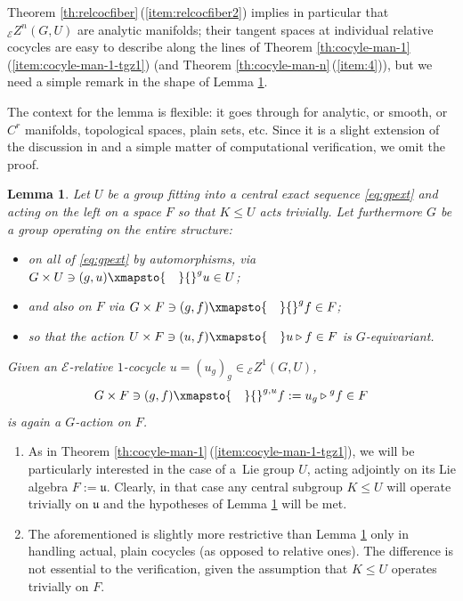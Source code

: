 \documentclass[pdftex]{sigma}
\numberwithin{equation}{section}
\newtheorem{Lemma}[Theorem]{Lemma}
\newcommand\cE{{\mathcal E}}
\newcommand\fu{{\mathfrak u}}
\begin{document}
Theorem \ref{th:relcocfiber}\,(\ref{item:relcocfiber2}) implies in particular that ${}_{\cE}Z^n(G,U)$ are analytic manifolds; their tangent spaces at individual relative cocycles are easy to describe along the lines of Theorem \ref{th:cocyle-man-1}\,(\ref{item:cocyle-man-1-tgz1}) (and Theorem \ref{th:cocyle-man-n}\,(\ref{item:4})), but we need a simple remark in the shape of Lemma \ref{le:equivact}.

The context for the lemma is flexible: it goes through for analytic, or smooth, or $C^r$ manifolds, topological spaces, plain sets, etc. Since it is a slight extension of the discussion in \cite[Section~5.3]{ser-gal} and a simple matter of computational verification, we omit the proof.



\begin{Lemma}\label{le:equivact}
 Let $U$ be a group fitting into a central exact sequence \eqref{eq:gpext} and acting on the left on a space $F$ so that $K\le U$ acts trivially. Let furthermore $G$ be a group operating on the entire structure:
 \begin{itemize}\itemsep=0pt
 \item on all of \eqref{eq:gpext} by automorphisms, via $ G\times U\ni (g,u)\xmapsto{\quad}{}^g u\in U$;
 \item and also on $F$ via $ G\times F\ni (g,f)\xmapsto{\quad}{}^g f\in F$;
 \item so that the action $U\times F\ni (u,f)\xmapsto{\quad} u\triangleright f \in F$
 is $G$-equivariant.
 \end{itemize}
 Given an $\cE$-relative $1$-cocycle $u=(u_g)_g\in {}_{\cE}Z^1(G,U)$,
 \begin{equation*}
 G\times F\ni (g,f)\xmapsto{\quad}
 {}^{g,u} f := u_g\triangleright {}^g f
 \in F
 \end{equation*}
 is again a $G$-action on $F$. \qedhere
\end{Lemma}

\begin{Remarks}\label{res:howserre}\quad
 \begin{enumerate}[(1)]\itemsep=0pt

 \item As in Theorem \ref{th:cocyle-man-1}\,(\ref{item:cocyle-man-1-tgz1}), we will be particularly interested in the case of a~Lie group $U$, acting adjointly on its Lie algebra $F:=\fu$. Clearly, in that case any central subgroup $K\le U$ will operate trivially on $\fu$ and the hypotheses of Lemma \ref{le:equivact} will be met.

 \item The aforementioned \cite[Section~5.3]{ser-gal} is slightly more restrictive than Lemma \ref{le:equivact} only in handling actual, plain cocycles (as opposed to relative ones). The difference is not essential to the verification, given the assumption that $K\le U$ operates trivially on $F$.
 \end{enumerate}
\end{Remarks}
\end{document}
